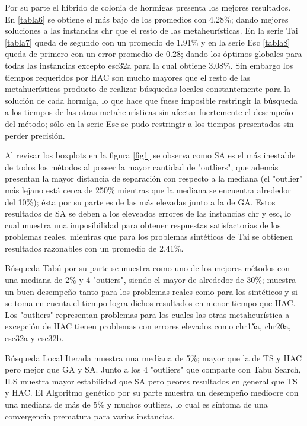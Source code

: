 \documentclass{ci5652}
\begin{document}
Por su parte el híbrido de colonia de hormigas presenta los mejores resultados. En \ref{tabla6} se obtiene el más bajo de los promedios con 4.28\%; dando mejores soluciones a las instancias chr que el resto de las metaheurísticas. En la serie Tai \ref{tabla7} queda de segundo con un promedio de 1.91\% y en la serie Esc \ref{tabla8} queda de primero con un error promedio de 0.28; dando los óptimos globales para todas las instancias excepto esc32a para la cual obtiene 3.08\%. Sin embargo los tiempos requeridos por HAC son mucho mayores que el resto de las metahuerísticas producto de realizar búsquedas locales constantemente para la solución de cada hormiga, lo que hace que fuese imposible restringir la búsqueda a los tiempos de las otras metaheurísticas sin afectar fuertemente el desempeño del método; sólo en la serie Esc se pudo restringir a los tiempos presentados sin perder precisión.

Al revisar los boxplots en la figura \ref{fig1} se observa como SA es el más inestable de todos los métodos al poseer la mayor cantidad de "outliers", que además presentan la mayor distancia de separación con respecto a la mediana (el "outlier" más lejano está cerca de 250\% mientras que la mediana se encuentra alrededor del 10\%); ésta por su parte es de las más elevadas junto a la de GA. Estos resultados de SA se deben a los eleveados errores de las instancias chr y esc, lo cual muestra una imposibilidad para obtener respuestas satisfactorias de los problemas reales, mientras que para los problemas sintéticos de Tai se obtienen resultados razonables con un promedio de 2.41\%.

Búsqueda Tabú por su parte se muestra como uno de los mejores métodos con una mediana de 2\% y 4 "outiers", siendo el mayor de alrededor de 30\%; muestra un buen desempeño tanto para los problemas reales como para los sintéticos y si se toma en cuenta el tiempo logra dichos resultados en menor tiempo que HAC. Los "outliers" representan problemas para los cuales las otras metaheurística a excepción de HAC tienen problemas con errores elevados como chr15a, chr20a, esc32a y esc32b.

Búsqueda Local Iterada muestra una mediana de 5\%; mayor que la de TS y HAC pero mejor que GA y SA. Junto a los 4 "outliers" que comparte con Tabu Search, ILS muestra mayor estabilidad que SA pero peores resultados en general que TS y HAC. El Algoritmo genético por su parte muestra un desempeño mediocre con una mediana de más de 5\% y muchos outliers, lo cual es síntoma de una convergencia prematura para varias instancias.
\end{document}
